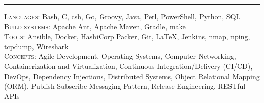 \documentclass{res}
\begin{document}
\begin{resume}
\hrule width18.5cm
\textsc{Languages:} Bash, C, csh, Go, Groovy, Java, Perl, PowerShell, Python, SQL\\[2mm]
\textsc{Build systems:} Apache Ant, Apache Maven, Gradle, make\\[2mm]
\textsc{Tools:} Ansible, Docker, HashiCorp Packer, Git, \LaTeX, Jenkins, nmap, nping, tcpdump, Wireshark\\[2mm]
\textsc{Concepts:} Agile Development, Operating Systems, Computer Networking, Containerization and Virtualization, Continuous Integration/Delivery (CI/CD), DevOps, Dependency Injections, Distributed Systems, Object Relational Mapping (ORM), Publish-Subscribe Messaging Pattern, Release Engineering, RESTful APIs\\[0.5mm]
\vspace{-2mm}
\end{resume}
\end{document}
